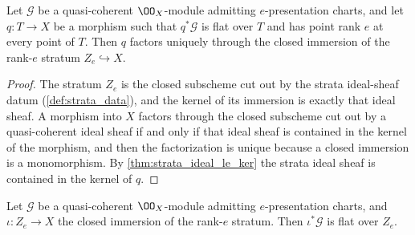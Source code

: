\begin{theorem}
  \label{thm:stratum_lift_unique}
  \leanok
  Let \(\mathcal G\) be a quasi-coherent \(\OO_X\)-module admitting
  \(e\)-presentation charts, and let \(q : T \to X\) be a morphism such that
  \(q^*\mathcal G\) is flat over \(T\) and has point rank \(e\) at every
  point of \(T\).  Then \(q\) factors uniquely through the closed immersion
  of the rank-\(e\) stratum \(Z_e \hookrightarrow X\).
\end{theorem}

\begin{proof}
  \leanok
  The stratum \(Z_e\) is the closed subscheme cut out by the strata
  ideal-sheaf datum (\cref{def:strata_data}), and the kernel of its
  immersion is exactly that ideal sheaf.  A morphism into \(X\) factors
  through the closed subscheme cut out by a quasi-coherent ideal sheaf if
  and only if that ideal sheaf is contained in the kernel of the morphism,
  and then the factorization is unique because a closed immersion is a
  monomorphism.  By \cref{thm:strata_ideal_le_ker} the strata ideal sheaf is
  contained in the kernel of \(q\).
\end{proof}

\begin{theorem}
  \label{thm:stratum_flattens}
  \leanok
  Let \(\mathcal G\) be a quasi-coherent \(\OO_X\)-module admitting
  \(e\)-presentation charts, and \(\iota : Z_e \to X\) the closed immersion
  of the rank-\(e\) stratum.  Then \(\iota^*\mathcal G\) is flat over
  \(Z_e\).
\end{theorem}

